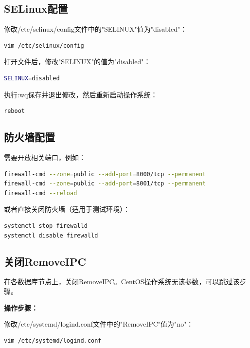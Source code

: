 \documentclass[12pt,UTF8]{ctexbook}
\begin{document}
\subsection{SELinux配置}

修改/etc/selinux/config文件中的"SELINUX"值为"disabled"：

\begin{lstlisting}[language=bash, caption=修改SELinux配置]
vim /etc/selinux/config
\end{lstlisting}

打开文件后，修改"SELINUX"的值为"disabled"：

\begin{lstlisting}[language=bash, caption=SELinux配置内容]
SELINUX=disabled
\end{lstlisting}

执行:wq保存并退出修改，然后重新启动操作系统：

\begin{lstlisting}[language=bash, caption=重启操作系统]
reboot
\end{lstlisting}

\subsection{防火墙配置}

需要开放相关端口，例如：

\begin{lstlisting}[language=bash, caption=开放防火墙端口]
firewall-cmd --zone=public --add-port=8000/tcp --permanent
firewall-cmd --zone=public --add-port=8001/tcp --permanent
firewall-cmd --reload
\end{lstlisting}

或者直接关闭防火墙（适用于测试环境）：

\begin{lstlisting}[language=bash, caption=关闭防火墙]
systemctl stop firewalld
systemctl disable firewalld
\end{lstlisting}

\subsection{关闭RemoveIPC}

在各数据库节点上，关闭RemoveIPC。CentOS操作系统无该参数，可以跳过该步骤。

\textbf{操作步骤：}

修改/etc/systemd/logind.conf文件中的"RemoveIPC"值为"no"：

\begin{lstlisting}[language=bash, caption=修改logind.conf]
vim /etc/systemd/logind.conf
\end{lstlisting}
\end{document}
